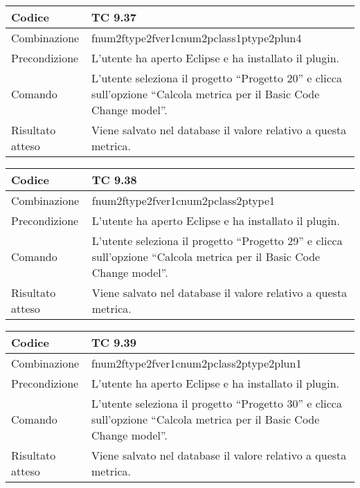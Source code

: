 \begin{table}[ht]
\begin{tabular}{|p{3cm}|p{9cm}|}
\hline
\cellcolor{lightgray}Codice				& TC 9.37								\\
\hline
\cellcolor{lightgray}Combinazione		& fnum2ftype2fver1cnum2pclass1ptype2plun4									\\
\hline
\cellcolor{lightgray}Precondizione		& L'utente ha aperto Eclipse e ha installato il plugin.		\\
\hline
\cellcolor{lightgray}Comando			& L'utente seleziona il progetto ``Progetto 20''  e clicca sull'opzione ``Calcola metrica per il Basic Code Change model''.	\\
\hline
\cellcolor{lightgray}Risultato atteso	& Viene salvato nel database il valore relativo a questa metrica.\\
\hline
\end{tabular}
\end{table}

\begin{table}[ht]
\begin{tabular}{|p{3cm}|p{9cm}|}
\hline
\cellcolor{lightgray}Codice				& TC 9.38								\\
\hline
\cellcolor{lightgray}Combinazione		& fnum2ftype2fver1cnum2pclass2ptype1									\\
\hline
\cellcolor{lightgray}Precondizione		& L'utente ha aperto Eclipse e ha installato il plugin.		\\
\hline
\cellcolor{lightgray}Comando			& L'utente seleziona il progetto ``Progetto 29''  e clicca sull'opzione ``Calcola metrica per il Basic Code Change model''.	\\
\hline
\cellcolor{lightgray}Risultato atteso	& Viene salvato nel database il valore relativo a questa metrica.\\
\hline
\end{tabular}
\end{table}

\begin{table}[ht]
\begin{tabular}{|p{3cm}|p{9cm}|}
\hline
\cellcolor{lightgray}Codice				& TC 9.39								\\
\hline
\cellcolor{lightgray}Combinazione		& fnum2ftype2fver1cnum2pclass2ptype2plun1									\\
\hline
\cellcolor{lightgray}Precondizione		& L'utente ha aperto Eclipse e ha installato il plugin.		\\
\hline
\cellcolor{lightgray}Comando			& L'utente seleziona il progetto ``Progetto 30''  e clicca sull'opzione ``Calcola metrica per il Basic Code Change model''.	\\
\hline
\cellcolor{lightgray}Risultato atteso	& Viene salvato nel database il valore relativo a questa metrica.\\
\hline
\end{tabular}
\end{table}

